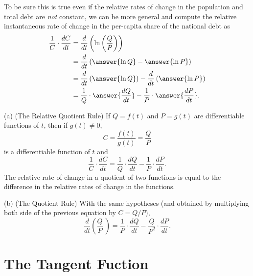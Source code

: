 \documentclass{ximera}
\begin{document}
\begin{question}
\begin{explanation}
To be sure this is true even if the relative rates of change in the population and total debt are \emph{not} constant, we can be more general and compute the relative instantaneous rate of change in the per-capita share of the national debt as
\begin{align*}
        \frac{1}{C} \cdot \frac{dC}{dt} &= \frac{d}{dt}\left( \ln \left(\frac{Q}{P}\right)  \right) \\
                                                      &= \frac{d}{dt} \left(  \answer{\ln Q} - \answer{\ln P}     \right) \\
                                                      &= \frac{d}{dt} \left( \answer{\ln Q} \right) - \frac{d}{dt} \left(  \answer{\ln P} \right)  \\
                                                      &= \frac{1}{Q} \cdot \answer{\frac{dQ}{dt}} - \frac{1}{P} \cdot \answer{\frac{dP}{dt}} .
\end{align*}


\end{explanation}
\end{question}


\begin{theorem}
(a) (The Relative Quotient Rule)
If $Q=f(t)$ and $P=g(t)$ are differentiable functions of $t$, then if $g(t)\neq 0$,
\[
     C = \frac{f(t)}{g(t)} = \frac{Q}{P}
\]
is a differentiable function of $t$ and
\[
\frac{1}{C} \cdot \frac{dC}{dt} = \frac{1}{Q} \cdot \frac{dQ}{dt} - \frac{1}{P} \cdot \frac{dP}{dt}.
\]
The relative rate of change in a quotient of two functions is equal to the difference in the relative rates of change in the functions.

(b) (The Quotient Rule) With the same hypotheses (and obtained by multiplying both side of the previous equation by $C=Q/P$), 
\[
       \frac{d}{dt}\left( \frac{Q}{P} \ \right) = \frac{1}{P} \cdot \frac{dQ}{dt} - \frac{Q}{P^2} \cdot \frac{dP}{dt} .
\]
\end{theorem}


\section*{The Tangent Fuction}
\end{document}
